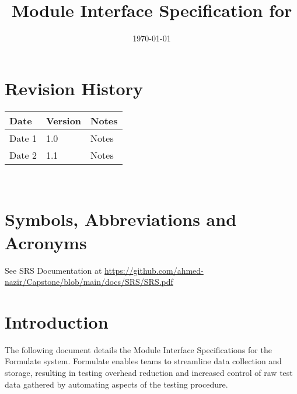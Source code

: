 \documentclass[12pt, titlepage]{article}
\begin{document}
\title{Module Interface Specification for \progname{}}

\author{\authname}

\date{\today}

\maketitle


\section{Revision History}

\begin{tabularx}{\textwidth}{p{3cm}p{2cm}X}
\toprule {\bf Date} & {\bf Version} & {\bf Notes}\\
\midrule
Date 1 & 1.0 & Notes\\
Date 2 & 1.1 & Notes\\
\bottomrule
\end{tabularx}

~\newpage

\section{Symbols, Abbreviations and Acronyms}

See SRS Documentation at \url{https://github.com/ahmed-nazir/Capstone/blob/main/docs/SRS/SRS.pdf} 


\newpage

\tableofcontents

\newpage


\section{Introduction}

The following document details the Module Interface Specifications for the Formulate system. Formulate enables teams to streamline data collection and storage, resulting in testing overhead reduction and increased control of raw test data gathered by automating aspects of the testing procedure. \\
\end{document}
